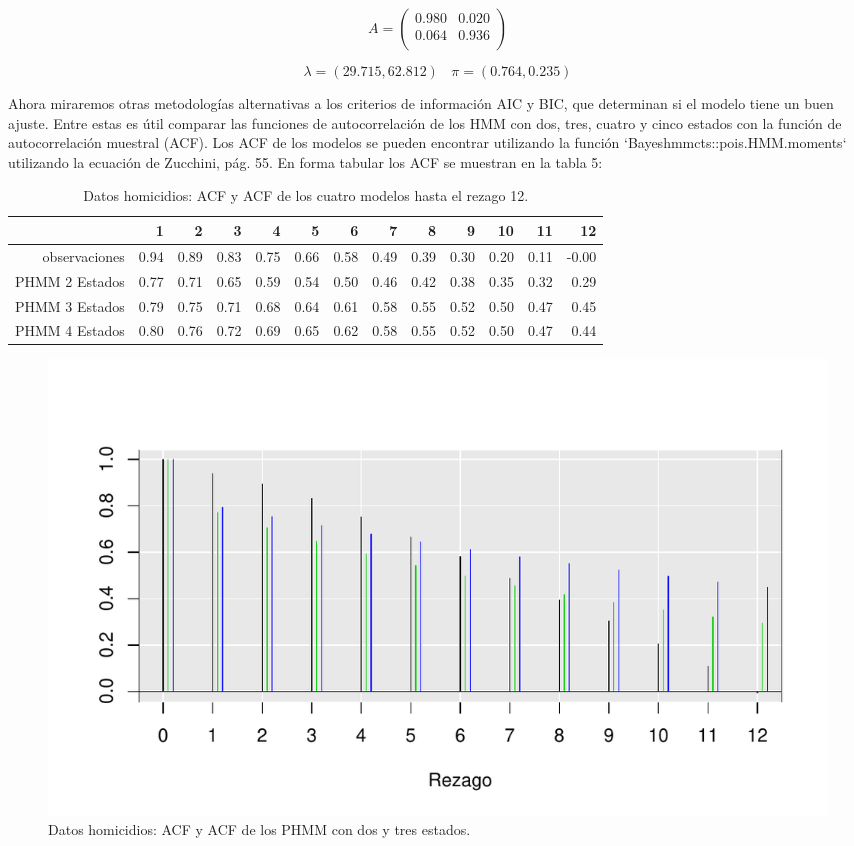 \documentclass[a4paper]{article}\usepackage[]{graphicx}\usepackage[]{color}
\makeatletter
\def\maxwidth{ %
  \ifdim\Gin@nat@width>\linewidth
    \linewidth
  \else
    \Gin@nat@width
  \fi
}
\newenvironment{knitrout}{}{} %
\makeatother
\begin{document}
$$
A = \begin{pmatrix}{}
  0.980 & 0.020 \\ 
  0.064 & 0.936 \\ 
\end{pmatrix}
$$

$$\lambda = (29.715, 62.812) \ \ \ \ \pi = (0.764, 0.235)$$

Ahora miraremos otras metodologías alternativas a los criterios de información AIC y BIC, que determinan si el modelo tiene un buen ajuste. Entre estas es útil comparar las funciones de autocorrelación de los HMM con dos, tres, cuatro y cinco estados con la función de autocorrelación muestral (ACF). Los ACF de los modelos se pueden encontrar utilizando la función `Bayeshmmcts::pois.HMM.moments` utilizando la ecuación de Zucchini, pág. 55. En forma tabular los ACF se muestran en la tabla 5:

\begin{table}[ht]
\centering
\begin{tabular}{rrrrrrrrrrrrr}
  \hline
 & 1 & 2 & 3 & 4 & 5 & 6 & 7 & 8 & 9 & 10 & 11 & 12 \\ 
  \hline
observaciones & 0.94 & 0.89 & 0.83 & 0.75 & 0.66 & 0.58 & 0.49 & 0.39 & 0.30 & 0.20 & 0.11 & -0.00 \\ 
  PHMM 2 Estados & 0.77 & 0.71 & 0.65 & 0.59 & 0.54 & 0.50 & 0.46 & 0.42 & 0.38 & 0.35 & 0.32 & 0.29 \\ 
  PHMM 3 Estados & 0.79 & 0.75 & 0.71 & 0.68 & 0.64 & 0.61 & 0.58 & 0.55 & 0.52 & 0.50 & 0.47 & 0.45 \\ 
  PHMM 4 Estados & 0.80 & 0.76 & 0.72 & 0.69 & 0.65 & 0.62 & 0.58 & 0.55 & 0.52 & 0.50 & 0.47 & 0.44 \\ 
   \hline
\end{tabular}
\caption{Datos homicidios: ACF y ACF de los cuatro modelos hasta el rezago 12.} 
\end{table}


\begin{knitrout}
\color{fgcolor}\begin{figure}[h]
\includegraphics[width=\maxwidth]{figure/unnamed-chunk-16-1} \caption[Datos homicidios]{Datos homicidios: ACF y ACF de los PHMM con dos y tres estados.}\label{fig:unnamed-chunk-16}
\end{figure}


\end{knitrout}
\end{document}
